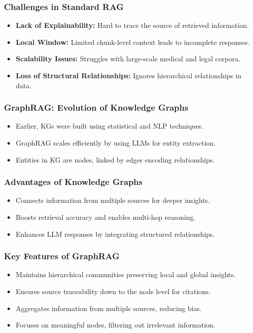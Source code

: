 \begin{frame}[fragile]\frametitle{Challenges in Standard RAG}
    \begin{itemize}
        \item \textbf{Lack of Explainability:} Hard to trace the source of retrieved information.
        \item \textbf{Local Window:} Limited chunk-level context leads to incomplete responses.
        \item \textbf{Scalability Issues:} Struggles with large-scale medical and legal corpora.
        \item \textbf{Loss of Structural Relationships:} Ignores hierarchical relationships in data.
    \end{itemize}
\end{frame}

\begin{frame}[fragile]\frametitle{GraphRAG: Evolution of Knowledge Graphs}
    \begin{itemize}
        \item Earlier, KGs were built using statistical and NLP techniques.
        \item GraphRAG scales efficiently by using LLMs for entity extraction.
        \item Entities in KG are nodes, linked by edges encoding relationships.
    \end{itemize}
\end{frame}

\begin{frame}[fragile]\frametitle{Advantages of Knowledge Graphs}
    \begin{itemize}
        \item Connects information from multiple sources for deeper insights.
        \item Boosts retrieval accuracy and enables multi-hop reasoning.
        \item Enhances LLM responses by integrating structured relationships.
    \end{itemize}
\end{frame}

\begin{frame}[fragile]\frametitle{Key Features of GraphRAG}
    \begin{itemize}
        \item Maintains hierarchical communities preserving local and global insights.
        \item Ensures source traceability down to the node level for citations.
        \item Aggregates information from multiple sources, reducing bias.
        \item Focuses on meaningful nodes, filtering out irrelevant information.
    \end{itemize}
\end{frame}


